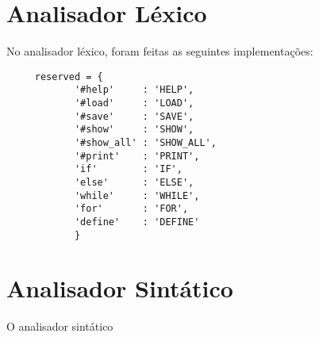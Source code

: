 \documentclass[12pt]{article}
\begin{document}
\section{Analisador Léxico}

No analisador léxico, foram feitas as seguintes implementações:

\begin{verbatim}
     reserved = {
            '#help'     : 'HELP',
            '#load'     : 'LOAD',
            '#save'     : 'SAVE',
            '#show'     : 'SHOW',
            '#show_all' : 'SHOW_ALL',
            '#print'    : 'PRINT',
            'if'        : 'IF',
            'else'      : 'ELSE',
            'while'     : 'WHILE',
            'for'       : 'FOR',
            'define'    : 'DEFINE'
            }
\end{verbatim}



\section{Analisador Sintático}

O analisador sintático 
\end{document}
